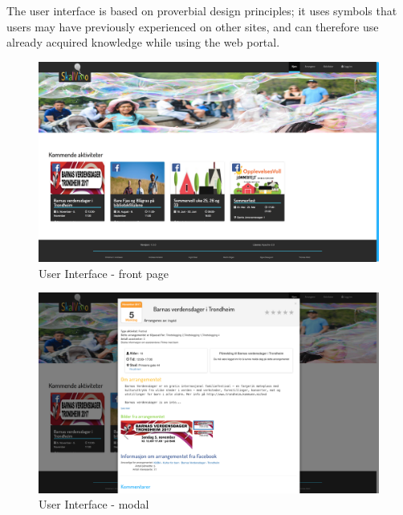 The user interface is based on proverbial design principles; it uses symbols that users may have previously experienced on other sites, and can therefore use already acquired knowledge while using the web portal.  

\begin{figure}[H]
\centering
    \includegraphics[width=\textwidth]{fig/frontpage.png}
\caption{User Interface - front page}
\label{Front Page}
\end{figure}

\begin{figure}[H]
\centering
    \includegraphics[width=\textwidth]{fig/modal.png}
\caption{User Interface - modal}
\label{Modal}
\end{figure}

\cleardoublepage